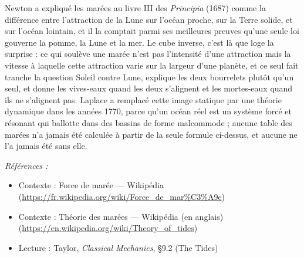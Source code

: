 \documentclass[11pt]{article}
\newenvironment{refs}{\par\small\noindent\emph{Références :}\begin{itemize}\setlength\itemsep{0pt}}{\end{itemize}\normalsize}
\begin{document}
\noindent Newton a expliqué les marées au livre III des \textit{Principia} (1687) comme la
différence entre l'attraction de la Lune sur l'océan proche, sur la Terre solide, et sur l'océan
lointain, et il la comptait parmi ses meilleures preuves qu'une seule loi gouverne la pomme, la
Lune et la mer. Le cube inverse, c'est là que loge la surprise : ce qui soulève une marée n'est
pas l'intensité d'une attraction mais la vitesse à laquelle cette attraction varie sur la largeur
d'une planète, et ce seul fait tranche la question Soleil contre Lune, explique les deux
bourrelets plutôt qu'un seul, et donne les vives-eaux quand les deux s'alignent et les mortes-eaux
quand ils ne s'alignent pas. Laplace a remplacé cette image statique par une théorie dynamique
dans les années 1770, parce qu'un océan réel est un système forcé et résonant qui ballotte dans
des bassins de forme malcommode ; aucune table des marées n'a jamais été calculée à partir de la
seule formule ci-dessus, et aucune ne l'a jamais été sans elle.

\begin{refs}
\item Contexte : Force de marée --- Wikipédia (\url{https://fr.wikipedia.org/wiki/Force_de_mar%C3%A9e})
\item Contexte : Théorie des marées --- Wikipédia (en anglais) (\url{https://en.wikipedia.org/wiki/Theory_of_tides})
\item Lecture : Taylor, \textit{Classical Mechanics}, \S{}9.2 (The Tides)
\end{refs}

\bigskip
\end{document}
